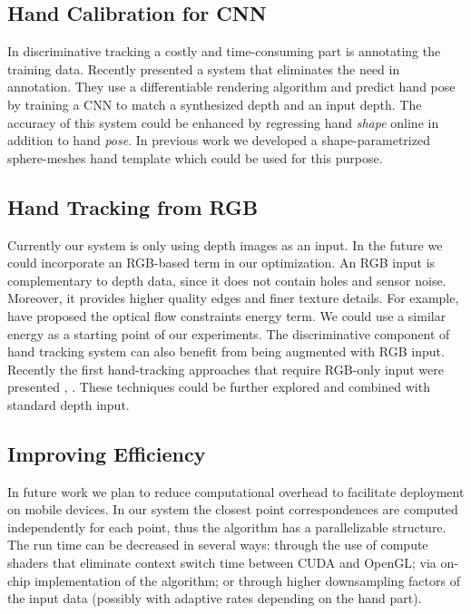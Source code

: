 \subsection*{Hand Calibration for CNN}
In discriminative tracking a costly and time-consuming part is annotating the training data. Recently \cite{ dibra2017refine} presented a system that eliminates the need in annotation. They use a differentiable rendering algorithm and predict hand pose by training a CNN to match a synthesized depth and an input depth. The accuracy of this system could be enhanced by regressing hand \textit{shape} online in addition to hand \textit{pose}. In previous work we developed a shape-parametrized sphere-meshes hand template which could be used for this purpose.

\subsection*{Hand Tracking from RGB}
Currently our system is only using depth images as an input. In the future we could incorporate an RGB-based term in our optimization. An RGB input is complementary to depth data, since it does not contain holes and sensor noise. Moreover, it provides higher quality edges and finer texture details. For example, \cite{weise2011realtime} have proposed the optical flow constraints energy term. We could use a similar energy as a starting point of our experiments. The discriminative component of hand tracking system can also benefit from being augmented with RGB input. Recently the first hand-tracking approaches that require RGB-only input were presented \cite{simon2017hand}, \cite{zimmermann2017learning}. These techniques could be further explored and combined with standard depth input.

\subsection*{Improving Efficiency}
In future work we plan to reduce computational overhead to facilitate deployment on mobile devices. In our system the closest point correspondences are computed independently for each point, thus the algorithm has a parallelizable structure. The run time can be decreased in several ways: through the use of compute shaders that eliminate context switch time between CUDA and OpenGL; via on-chip implementation of the algorithm; or through higher downsampling factors of the input data (possibly with adaptive rates depending on the hand part).

